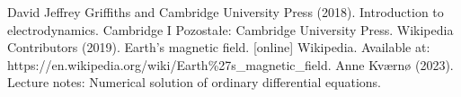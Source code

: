 \documentclass[final,5p,times,twocolumn,authoryear]{elsarticle}
\begin{document}
 
\begin{thebibliography}{3}
David Jeffrey Griffiths and Cambridge University Press (2018). Introduction to electrodynamics. Cambridge I Pozostałe: Cambridge University Press.
Wikipedia Contributors (2019). Earth’s magnetic field. [online] Wikipedia. Available at: https://en.wikipedia.org/wiki/Earth\%27s\_magnetic\_field.
 Anne Kværnø (2023). Lecture notes: Numerical solution of ordinary differential equations.


\end{thebibliography}





\end{document}
